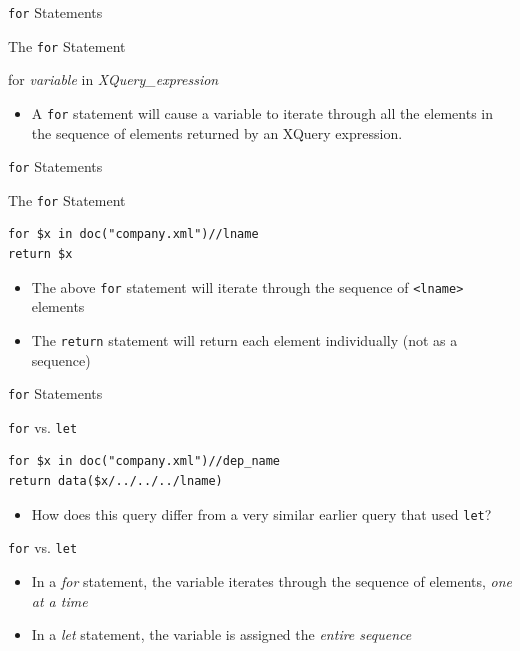 \documentclass[svgnames]{beamer}
\begin{document}
\begin{frame}[fragile]{\texttt{for} Statements}
\small
\begin{block}{The \texttt{for} Statement}
\begin{semiverbatim}
for \textit{variable} in \textit{XQuery\_expression}
\end{semiverbatim}
\end{block}
\normalsize
\begin{itemize}
	\item A \texttt{for} statement will cause a variable to iterate through all the elements in the sequence of elements returned by an XQuery expression.
\end{itemize}
\end{frame}

\begin{frame}[fragile]{\texttt{for} Statements}
\small
\begin{block}{The \texttt{for} Statement}
\begin{verbatim}
for $x in doc("company.xml")//lname
return $x
\end{verbatim}
\end{block}
\normalsize
\begin{itemize}
	\item The above \texttt{for} statement will iterate through the sequence of \texttt{<lname>} elements
	\item The \texttt{return} statement will return each element individually (not as a sequence)
\end{itemize}
\end{frame}

\begin{frame}[fragile]{\texttt{for} Statements}
\small
\begin{block}{\texttt{for} vs. \texttt{let}}
\begin{verbatim}
for $x in doc("company.xml")//dep_name
return data($x/../../../lname)
\end{verbatim}
\end{block}
\normalsize
\begin{itemize}
	\item How does this query differ from a very similar earlier query that used \texttt{let}?
\end{itemize}
\end{frame}

\begin{frame}[fragile]{\texttt{for} vs. \texttt{let}}
\begin{itemize}
	\item In a \emph{for} statement, the variable iterates through the sequence of elements, \emph{one at a time}
	\item In a \emph{let} statement, the variable is assigned the \emph{entire sequence}
\end{itemize}
\end{frame}
\end{document}
